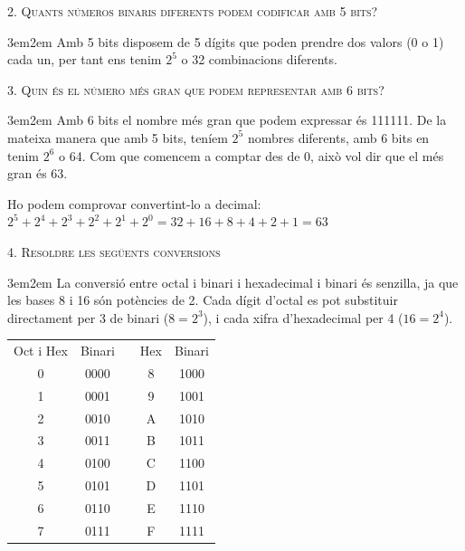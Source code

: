 \documentclass[a4paper,12pt]{report}
\newenvironment{resposta}
	{\begin{adjustwidth}{3em}{2em}}
	{\end{adjustwidth}}
\begin{document}
\textsc{{\large 2.} Quants números binaris diferents podem codificar amb 5 bits?}

\begin{resposta}
	Amb 5 bits disposem de 5 dígits que poden prendre dos valors (0 o 1) cada un, per tant ens tenim $2^5$ o 32 combinacions diferents.
\end{resposta}
\vspace{1em}

\textsc{{\large 3.}  Quin és el número més gran que podem representar amb 6 bits?}

\begin{resposta}
	Amb 6 bits el nombre més gran que podem expressar és 111111. De la mateixa manera que amb 5 bits, teníem $2^5$ nombres diferents, amb 6 bits en tenim $2^6$ o 64. Com que comencem a comptar des de 0, això vol dir que el més gran és 63.

	Ho podem comprovar convertint-lo a decimal:
	$2^5+2^4+2^3+2^2+2^1+2^0 = 32+16+8+4+2+1 = 63$
\end{resposta}

\pagebreak

\textsc{{\large 4.}  Resoldre les següents conversions}

\begin{resposta}
	La conversió entre octal i binari i hexadecimal i binari és senzilla, ja que les bases 8 i 16 són potències de 2. Cada dígit d'octal es pot substituir directament per 3 de binari ($8 = 2^3$), i cada xifra d'hexadecimal per 4 ($16 = 2^4$).
\end{resposta}

\begin{center}
	\begin{tabular}{c c c c c}
		\cline{1-2} \cline{4-5}
		Oct i Hex & Binari && Hex & Binari \\
		\cline{1-2} \cline{4-5}
		0 & 0000 & & 8 & 1000 \\
		\cline{1-2} \cline{4-5}
		1 & 0001 & & 9 & 1001 \\
		\cline{1-2} \cline{4-5}
		2 & 0010 & & A & 1010 \\
		\cline{1-2} \cline{4-5}
		3 & 0011 & & B & 1011 \\
		\cline{1-2} \cline{4-5}
		4 & 0100 & & C & 1100 \\
		\cline{1-2} \cline{4-5}
		5 & 0101 & & D & 1101 \\
		\cline{1-2} \cline{4-5}
		6 & 0110 & & E & 1110 \\
		\cline{1-2} \cline{4-5}
		7 & 0111 & & F & 1111 \\
		\cline{1-2} \cline{4-5}
	\end{tabular}
\end{center}
\end{document}
